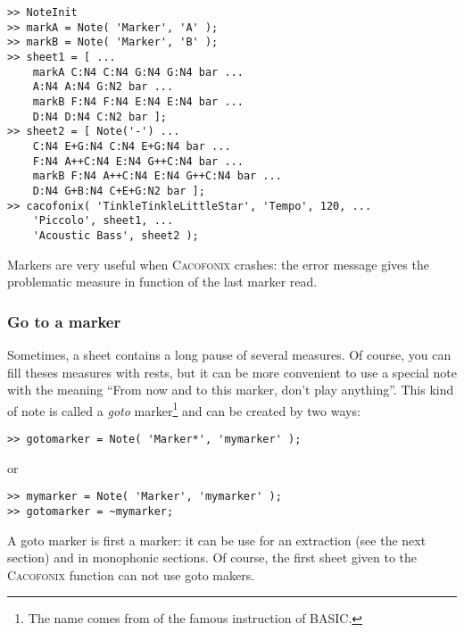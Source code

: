 \documentclass{article}
\newcommand\cacofonix{\textsc{Cacofonix}\xspace}
\begin{document}
\begin{lstlisting}
>> NoteInit
>> markA = Note( 'Marker', 'A' );
>> markB = Note( 'Marker', 'B' );
>> sheet1 = [ ...
	markA C:N4 C:N4 G:N4 G:N4 bar ...
	A:N4 A:N4 G:N2 bar ...
	markB F:N4 F:N4 E:N4 E:N4 bar ...
	D:N4 D:N4 C:N2 bar ];
>> sheet2 = [ Note('-') ...
	C:N4 E+G:N4 C:N4 E+G:N4 bar ...
	F:N4 A++C:N4 E:N4 G++C:N4 bar ...
	markB F:N4 A++C:N4 E:N4 G++C:N4 bar ...
	D:N4 G+B:N4 C+E+G:N2 bar ];
>> cacofonix( 'TinkleTinkleLittleStar', 'Tempo', 120, ...
	'Piccolo', sheet1, ...
	'Acoustic Bass', sheet2 );
\end{lstlisting}

Markers are very useful when \cacofonix crashes: the error message gives the problematic measure in function of the last marker read.

\subsubsection{Go to a marker}
\label{sec:Goto}

Sometimes, a sheet contains a long pause of several measures. Of course, you can fill theses measures with rests, but it can be more convenient to use a special note with the meaning ``From now and to this marker, don't play anything''. This kind of note is called a \emph{goto} marker\footnote{The name comes from of the famous instruction of BASIC.} and can be created by two ways: 
\begin{lstlisting}
>> gotomarker = Note( 'Marker*', 'mymarker' );
\end{lstlisting}
or
\begin{lstlisting}
>> mymarker = Note( 'Marker', 'mymarker' );
>> gotomarker = ~mymarker;
\end{lstlisting}

A goto marker is first a marker: it can be use for an extraction (see the next section) and in monophonic sections. Of course, the first sheet given to the \cacofonix function can not use goto makers.
\end{document}
